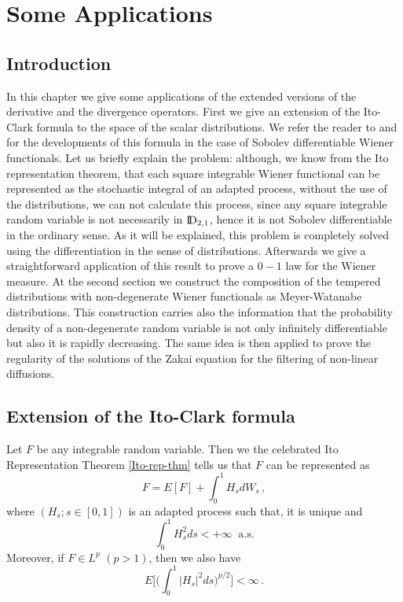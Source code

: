 \documentclass[12pt,a4paper]{book}
\newcommand{\DD}{{\rm I\!D}}
\begin{document}


\chapter{Some Applications}
\label{ch.appli}

\section*{Introduction}

In this chapter we give some applications of the extended versions of the
derivative and the divergence operators. First we give an extension of the
Ito-Clark formula to the space of the scalar distributions. We refer the reader to  \cite{Bi} and \cite{O} for the  developments of this formula in the case
of Sobolev differentiable Wiener functionals. 
 Let us briefly explain the problem:  although, we
know from the Ito representation theorem, that each square integrable Wiener
functional can be represented as the stochastic integral of an adapted
process, without the use of the distributions, we can not calculate
this process, since any square integrable random variable is not
necessarily in $\DD_{2,1}$, hence it is not Sobolev differentiable in
the ordinary sense. As it will be  explained, this problem is
completely solved using the differentiation in the sense of 
distributions. Afterwards we give a straightforward application of
this result to prove a $0-1$ law for the Wiener measure. At the second
section we construct the composition  of the tempered distributions
with non-degenerate Wiener functionals as Meyer-Watanabe
distributions. This construction carries also the information that the
probability density of a non-degenerate random variable is not only
infinitely differentiable but also it is rapidly decreasing. The same
idea is then applied to prove the regularity of the solutions of the
Zakai equation for the filtering of non-linear diffusions.

\section{Extension of the Ito-Clark formula}
Let $F$ be any integrable random variable. Then we the celebrated Ito
Representation Theorem \ref{Ito-rep-thm} tells us that  $F$ can
be represented as
$$
F=E[F]+\int_0^1 H_sdW_s\,,
$$
where $(H_s;s\in[0,1])$ is an adapted process such that, it is unique and
$$
\int_0^1 H_s^2ds<+\infty\;\;\mbox{a.s.}
$$
Moreover, if $F\in L^p$ $(p>1)$, then we also have
$$
E\Big[\Big(\int_0^1|H_s|^2ds\Big)^{p/2}\Big]<\infty\,.
$$
\end{document}
